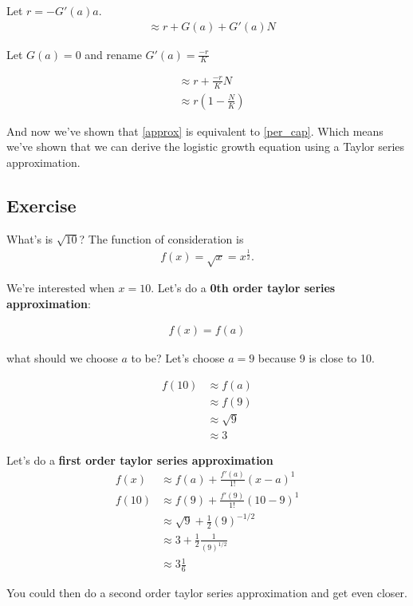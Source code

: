 \documentclass{article}
\begin{document}
Let $r =  - G'(a)a$.
\begin{align}
    & \approx r + G(a) + G'(a) N
\end{align}

Let $G(a) = 0$  and rename $G'(a) = \frac{-r}{K}$

\begin{align}
    &\approx r + \frac{-r}{K}N\\
    &\approx r(1 - \frac{N}{K}) \label{approx}
\end{align}

And now we've shown that \ref{approx} is equivalent to \ref{per_cap}. Which means we've shown that we can derive the logistic growth equation using a Taylor series approximation.

\subsection{Exercise}
What's is $\sqrt{10}$? The function of consideration is
\begin{align}
    f(x) = \sqrt{x} = x^{\frac{1}{2}}.
\end{align}

We're interested when $x = 10$. Let's do a \textbf{0th order taylor series approximation}: 

\begin{align}
    f(x) = f(a)
\end{align}

what should we choose $a$ to be? Let's choose $a = 9$ because 9 is close to 10. 

\begin{align}
    f(10) & \approx f(a) \\
    & \approx f(9)\\
    & \approx \sqrt{9}\\
    & \approx 3
\end{align}

Let's do a \textbf{first order taylor series approximation} 
\begin{align}
    f(x) &\approx f(a) + \frac{f'(a)}{1!}(x-a)^1\\
    f(10) &\approx f(9) +  \frac{f'(9)}{1!}(10-9)^1\\
    &\approx \sqrt{9} + \frac{1}{2}(9)^{-1/2}\\
    &\approx 3 + \frac{1}{2}\frac{1}{(9)^{1/2}}\\
    &\approx 3 \frac{1}{6}
\end{align}

You could then do a second order taylor series approximation and get even closer.
\end{document}
